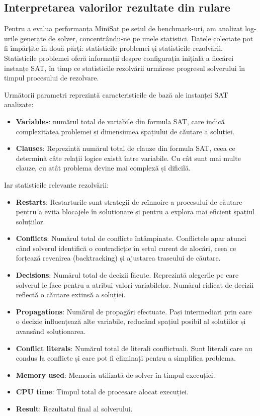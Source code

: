 \documentclass[runningheads]{llncs}
\begin{document}
\subsection{Interpretarea valorilor rezultate din rulare}
 
Pentru a evalua performanța MiniSat pe setul de benchmark-uri, am analizat log-urile generate de solver, concentrându-ne pe unele statistici. Datele colectate pot fi împărțite în două părți: statisticile problemei și statisticile rezolvării. Statisticile problemei oferă informații despre configurația inițială a fiecărei instanțe SAT, în timp ce statisticile rezolvării urmăresc progresul solverului în timpul procesului de rezolvare.
 
Următorii parametri reprezintă caracteristicile de bază ale instanței SAT analizate:
 
\begin{itemize}
    \item \textbf{Variables}: numărul total de variabile din formula SAT, care indică complexitatea problemei și dimensiunea spațiului de căutare a soluției.
    \item \textbf{Clauses}: Reprezintă numărul total de clauze din formula SAT, ceea ce determină câte relații logice există între variabile. Cu cât sunt mai multe clauze, cu atât problema devine mai complexă și dificilă.
\end{itemize}
 
Iar statisticile relevante rezolvării:
 
\begin{itemize}
    \item \textbf{Restarts}: Restarturile sunt strategii de reînnoire a procesului de căutare pentru a evita blocajele în soluționare și pentru a explora mai eficient spațiul soluțiilor.
    \item \textbf{Conflicts}: Numărul total de conflicte întâmpinate. Conflictele apar atunci când solverul identifică o contradicție în setul curent de alocări, ceea ce forțează revenirea (backtracking) și ajustarea traseului de căutare.
    \item \textbf{Decisions}: Numărul total de decizii făcute. Reprezintă alegerile pe care solverul le face pentru a atribui valori variabilelor. Numărul ridicat de decizii reflectă o căutare extinsă a soluției.
    \item \textbf{Propagations}: Numărul de propagări efectuate. Pași intermediari prin care o decizie influențează alte variabile, reducând spațiul posibil al soluțiilor și avansând soluționarea.
    \item \textbf{Conflict literals}: Numărul total de literali conflictuali. Sunt literali care au condus la conflicte și care pot fi eliminați pentru a simplifica problema.
    \item \textbf{Memory used}: Memoria utilizată de solver în timpul execuției.
    \item \textbf{CPU time}: Timpul total de procesare alocat execuției.
    \item \textbf{Result}: Rezultatul final al solverului.
\end{itemize}
\end{document}
